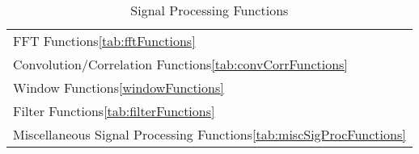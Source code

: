 \begin{table}[H]
\caption{Signal Processing Functions}
\label{tab:signalProcessingFunctions}
\begin{center}
\begin{tabular}{l}
FFT Functions\ref{tab:fftFunctions}\\
Convolution/Correlation Functions\ref{tab:convCorrFunctions}\\
Window Functions\ref{windowFunctions}\\
Filter Functions\ref{tab:filterFunctions}\\
Miscellaneous Signal Processing Functions\ref{tab:miscSigProcFunctions}\\
\end{tabular}
\end{center}
\label{default}
\end{table}%